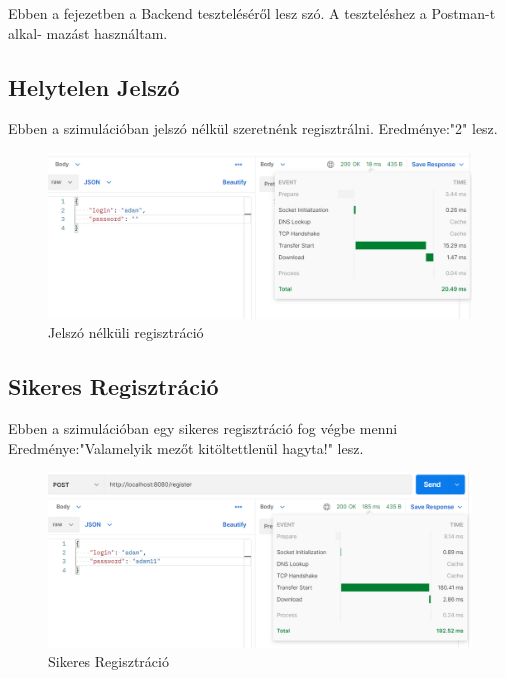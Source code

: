 
Ebben a fejezetben a Backend teszteléséről lesz szó. A teszteléshez a Postman-t alkal-
mazást használtam.


\subsection{Helytelen Jelszó}

Ebben a szimulációban jelszó nélkül szeretnénk regisztrálni. Eredménye:"2" lesz.
\begin{figure}[h]
\centering
\includegraphics[scale=0.6]{images/Hibas_regisztracio.png}
\caption{Jelszó nélküli regisztráció}
\label{fig:JWT}
\end{figure}

\subsection{Sikeres Regisztráció}
Ebben a szimulációban egy sikeres regisztráció fog végbe menni Eredménye:"Valamelyik mezőt kitöltettlenül hagyta!" lesz.
\begin{figure}[h]
\centering
\includegraphics[scale=0.6]{images/Sikeres_regisztracio.png}
\caption{Sikeres Regisztráció}
\label{fig:JWT}
\end{figure}